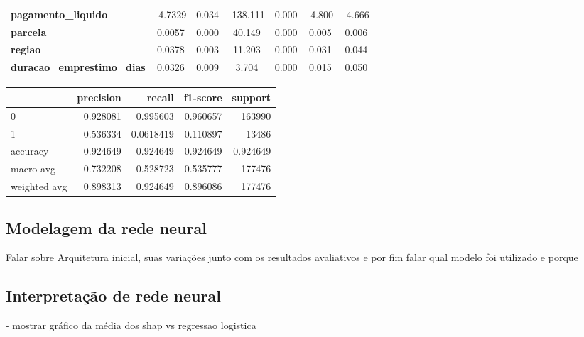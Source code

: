 \begin{tabular}{lcccccc}
\textbf{pagamento\_liquido}        &      -4.7329  &        0.034     &  -138.111  &         0.000        &       -4.800    &       -4.666     \\
\textbf{parcela}                   &       0.0057  &        0.000     &    40.149  &         0.000        &        0.005    &        0.006     \\
\textbf{regiao}                    &       0.0378  &        0.003     &    11.203  &         0.000        &        0.031    &        0.044     \\
\textbf{duracao\_emprestimo\_dias} &       0.0326  &        0.009     &     3.704  &         0.000        &        0.015    &        0.050     \\
\bottomrule
\end{tabular}

\centering
\begin{tabular}{lrrrr}
  \hline
                &   precision &    recall &   f1-score &       support \\
  \hline
   0            &    0.928081 & 0.995603  &   0.960657 & 163990        \\
   1            &    0.536334 & 0.0618419 &   0.110897 &  13486        \\
   accuracy     &    0.924649 & 0.924649  &   0.924649 &      0.924649 \\
   macro avg    &    0.732208 & 0.528723  &   0.535777 & 177476        \\
   weighted avg &    0.898313 & 0.924649  &   0.896086 & 177476        \\
  \hline
\end{tabular}



\subsection*{Modelagem da rede neural}
Falar sobre Arquitetura inicial, suas variações junto com os 
resultados avaliativos e por fim falar qual modelo foi utilizado
e porque

\subsection*{Interpretação de rede neural}

- mostrar gráfico da média dos shap vs regressao logistica


